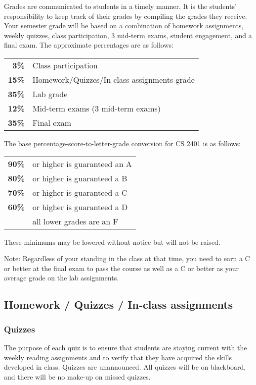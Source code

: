 \documentclass[12pt]{scrartcl}
\newcommand{\change}[2]{#2}
\begin{document}
Grades are communicated to students in a timely manner. 
It is the students’ responsibility to keep track of their grades by compiling the grades they receive. 
Your semester grade will be based on a combination of homework assignments, weekly quizzes, class participation, 3 mid-term exams, student engagement, and a final exam. 
The approximate percentages are as follows:
\begin{center}
\begin{tabular}{rl}
\textbf{3\% } & Class participation \\
\textbf{15\% } & Homework/Quizzes/In-class assignments grade\\
\textbf{35\% } & Lab grade\\
\textbf{12\% } & Mid-term exams (3 mid-term exams) \\
\textbf{35\% } & Final exam\\
\end{tabular}
\end{center}
The base percentage-score-to-letter-grade conversion for CS 2401 is as follows: 
\change{}{
\begin{center}
\begin{tabular}{rl}
\textbf{90\%}& or higher is guaranteed an A \\
\textbf{80\%}& or higher is guaranteed a B \\
\textbf{70\%}& or higher is guaranteed a C \\
\textbf{60\%}& or higher is guaranteed a D \\
\textbf{}& all lower grades are an F 
\end{tabular}
\end{center}
These minimums may be lowered without notice but will not be raised. 
}

Note: Regardless of your standing in the class at that time, you need to earn a C or better at the final exam to pass the course as well as a C or better as your average grade on the lab assignments. 

\subsection{Homework / Quizzes / In-class assignments}

\subsubsection{Quizzes}
The purpose of each quiz is to ensure that students are staying current with the weekly reading assignments and to verify that they have acquired the skills developed in class. 
Quizzes are unannounced. 
\change{}{All quizzes will be on blackboard, and there will be no make-up on missed quizzes.} 
\end{document}
